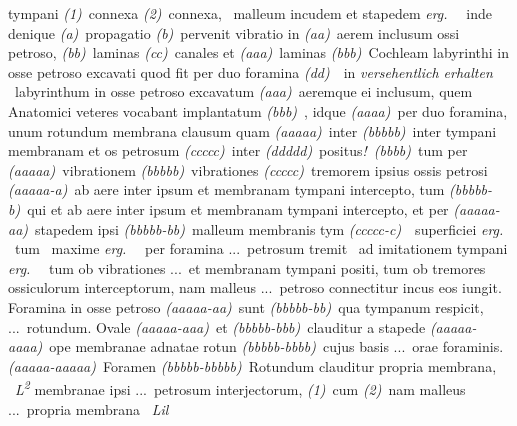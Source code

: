{{tympani
\textit{(1)}~connexa
\textit{(2)}~connexa,
\textbar~malleum incudem et stapedem \textit{erg.}~%
\textbar\ inde denique
\textit{(a)}~propagatio\protect{}
\textit{(b)}~pervenit vibratio in
\textit{(aa)}~aerem inclusum ossi petroso,\protect{}
\textit{(bb)}~laminas\protect{}
\textit{(cc)}~canales et\protect{}
\textit{(aaa)}~laminas
\textit{(bbb)}~Cochleam labyrinthi in osse petroso excavati quod fit per duo foramina
\textit{(dd)}~\textbar~in \textit{versehentlich erhalten}~%
\textbar\ labyrinthum in osse petroso excavatum
\textit{(aaa)}~aeremque ei inclusum, quem Anatomici veteres\protect{} vocabant implantatum\protect{}
\textit{(bbb)}~, idque
\textit{(aaaa)}~per duo foramina, unum rotundum\protect{} membrana\protect{} clausum quam
\textit{(aaaaa)}~inter
\textit{(bbbbb)}~inter tympani membranam\protect{} et os petrosum
\textit{(ccccc)}~inter
\textit{(ddddd)}~positus\lbrack\textit{!}\rbrack\
\textit{(bbbb)}~tum per
\textit{(aaaaa)}~vibrationem
\textit{(bbbbb)}~vibrationes
\textit{(ccccc)}~tremorem ipsius ossis petrosi
\textit{(aaaaa-a)}~ab aere inter ipsum et membranam tympani intercepto, tum
\textit{(bbbbb-b)}~qui et ab aere inter ipsum et membranam tympani intercepto, et per
\textit{(aaaaa-aa)}~stapedem ipsi
\textit{(bbbbb-bb)}~malleum membranis tym\protect{}
\textit{(ccccc-c)}~\textbar~superficiei \textit{erg.}~%
\textbar\ tum
\textbar~maxime \textit{erg.}~%
\textbar\ per foramina %
\lbrack...\rbrack\ petrosum tremit
\textbar~ad imitationem tympani \textit{erg.}~%
\textbar\ tum ob vibrationes %
\lbrack...\rbrack\ et membranam tympani positi, tum ob tremores ossiculorum interceptorum, nam malleus
\lbrack...\rbrack\ petroso connectitur incus eos iungit. Foramina in osse petroso
\textit{(aaaaa-aa)}~sunt
\textit{(bbbbb-bb)}~qua tympanum respicit, %
\lbrack...\rbrack\ rotundum. Ovale
\textit{(aaaaa-aaa)}~et
\textit{(bbbbb-bbb)}~clauditur a stapede
\textit{(aaaaa-aaaa)}~ope membranae adnatae rotun
\textit{(bbbbb-bbbb)}~cujus basis %
\lbrack...\rbrack\ orae foraminis.
\textit{(aaaaa-aaaaa)}~Foramen
\textit{(bbbbb-bbbbb)}~Rotundum clauditur propria membrana,%
~\textit{L\textsuperscript{2}}%
\hspace{0.5mm}
membranae ipsi \lbrack...\rbrack\ petrosum interjectorum,
\textit{(1)}~cum
\textit{(2)}~nam malleus
\lbrack...\rbrack\ propria membrana%
~\textit{Lil}}}

